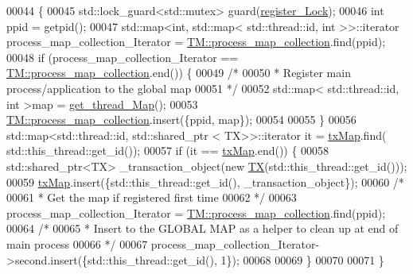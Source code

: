 \begin{DoxyCode}
00044 \{
00045     std::lock\_guard<std::mutex> guard(\hyperlink{class_t_m_aeb26546681bfe64e21606b8c012bb8c3_aeb26546681bfe64e21606b8c012bb8c3}{register\_Lock});
00046     \textcolor{keywordtype}{int} ppid = getpid();
00047     std::map<int, std::map< std::thread::id, int >>::iterator process\_map\_collection\_Iterator = 
      \hyperlink{class_t_m_a81c3bd28ad2343a620fa070f8ac186ca_a81c3bd28ad2343a620fa070f8ac186ca}{TM::process\_map\_collection}.find(ppid);
00048     \textcolor{keywordflow}{if} (process\_map\_collection\_Iterator == \hyperlink{class_t_m_a81c3bd28ad2343a620fa070f8ac186ca_a81c3bd28ad2343a620fa070f8ac186ca}{TM::process\_map\_collection}.end()) \{
00049         \textcolor{comment}{/*}
00050 \textcolor{comment}{         * Register main process/application to the global map
}
00051 \textcolor{comment}{         */}
00052         std::map< std::thread::id, int >map = \hyperlink{class_t_m_afb8bc9f42fe06c52747beb7f4c46915c_afb8bc9f42fe06c52747beb7f4c46915c}{get\_thread\_Map}();
00053         \hyperlink{class_t_m_a81c3bd28ad2343a620fa070f8ac186ca_a81c3bd28ad2343a620fa070f8ac186ca}{TM::process\_map\_collection}.insert(\{ppid, map\});
00054 
00055     \}
00056     std::map<std::thread::id, std::shared\_ptr < TX>>::iterator it = \hyperlink{class_t_m_a0333dfa193ea99d7626de74a2b932e9b_a0333dfa193ea99d7626de74a2b932e9b}{txMap}.find(
      std::this\_thread::get\_id());
00057     \textcolor{keywordflow}{if} (it == \hyperlink{class_t_m_a0333dfa193ea99d7626de74a2b932e9b_a0333dfa193ea99d7626de74a2b932e9b}{txMap}.end()) \{
00058         std::shared\_ptr<TX> \_transaction\_object(\textcolor{keyword}{new} \hyperlink{class_t_x}{TX}(std::this\_thread::get\_id()));
00059         \hyperlink{class_t_m_a0333dfa193ea99d7626de74a2b932e9b_a0333dfa193ea99d7626de74a2b932e9b}{txMap}.insert(\{std::this\_thread::get\_id(), \_transaction\_object\});
00060         \textcolor{comment}{/*}
00061 \textcolor{comment}{         * Get the map if registered first time
}
00062 \textcolor{comment}{         */}
00063         process\_map\_collection\_Iterator = \hyperlink{class_t_m_a81c3bd28ad2343a620fa070f8ac186ca_a81c3bd28ad2343a620fa070f8ac186ca}{TM::process\_map\_collection}.find(ppid);
00064         \textcolor{comment}{/*}
00065 \textcolor{comment}{         * Insert to the GLOBAL MAP as a helper to clean up at end of main process 
}
00066 \textcolor{comment}{         */}
00067         process\_map\_collection\_Iterator->second.insert(\{std::this\_thread::get\_id(), 1\});
00068 
00069     \}
00070 
00071 \}
\end{DoxyCode}


